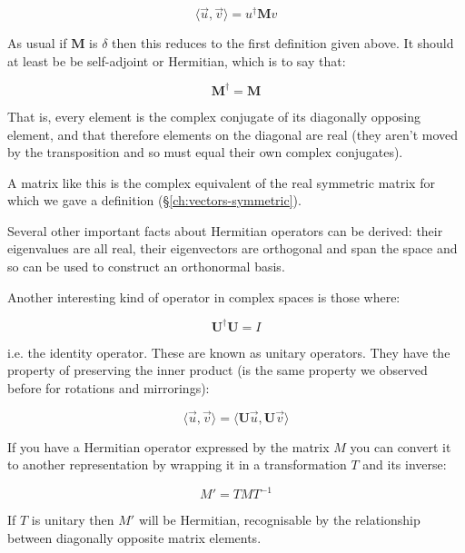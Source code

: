 $$
\langle \vec{u}, \vec{v} \rangle
=
u^\dagger \mathbf{M} v
$$

As usual if $\mathbf{M}$ is $\delta$ then this reduces to the first definition given above. It should at least be be self-adjoint or Hermitian, which is to say that:

$$\mathbf{M}^\dagger = \mathbf{M}$$

That is, every element is the complex conjugate of its diagonally opposing element, and that therefore elements on the diagonal are real (they aren't moved by the transposition and so must equal their own complex conjugates).

A matrix like this is the complex equivalent of the real symmetric matrix for which we gave a definition (§\ref{ch:vectors-symmetric}).

Several other important facts about Hermitian operators can be derived: their eigenvalues are all real, their eigenvectors are orthogonal and span the space and so can be used to construct an orthonormal basis.

Another interesting kind of operator in complex spaces is those where:

$$\mathbf{U}^\dagger \mathbf{U} = I$$

i.e. the identity operator. These are known as unitary operators. They have the property of preserving the inner product (is the same property we observed before for rotations and mirrorings):

$$\langle \vec{u}, \vec{v} \rangle = \langle \mathbf{U} \vec{u}, \mathbf{U} \vec{v} \rangle$$

If you have a Hermitian operator expressed by the matrix $M$ you can convert it to another representation by wrapping it in a transformation $T$ and its inverse:

$$M' = T M T^{-1}$$

If $T$ is unitary then $M'$ will be Hermitian, recognisable by the relationship between diagonally opposite matrix elements.